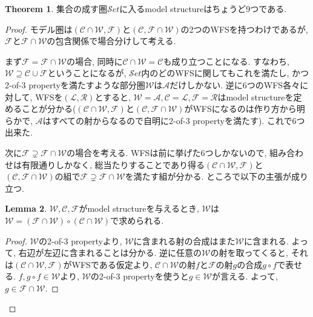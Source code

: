\documentclass[. /main]{subfiles}
\theoremstyle{definition}
\newtheorem{theo}{Theorem}
\newtheorem{lemm}[theo]{Lemma}
\begin{document}
\begin{theo}
集合の成す圏$\mathcal{S}et$に入るmodel structureはちょうど9つである. 
\end{theo}
\begin{proof}
モデル圏は$(\mathcal{C} \cap \mathcal{W},  \mathcal{F})$と$(\mathcal{C},  \mathcal{F} \cap \mathcal{W})$の2つのWFSを持つわけであるが, $\mathcal{F}$と$\mathcal{F} \cap \mathcal{W}$の包含関係で場合分けして考える. 

まず$\mathcal{F}=\mathcal{F} \cap \mathcal{W}$の場合, 同時に$\mathcal{C} \cap \mathcal{W}=\mathcal{C}$も成り立つことになる. すなわち, $\mathcal{W} \supseteq \mathcal{C} \cup \mathcal{F}$ということになるが, $\mathcal{S}et$内のどのWFSに関してもこれを満たし, かつ2-of-3 propertyを満たすような部分圏$\mathcal{W}$は$\mathcal{A}$だけしかない. 逆に6つのWFS各々に対して, WFSを$(\mathcal{L},  \mathcal{R})$とすると, $\mathcal{W}=\mathcal{A},  \mathcal{C}=\mathcal{L},  \mathcal{F}=\mathcal{R}$はmodel structureを定めることが分かる($(\mathcal{C} \cap \mathcal{W},  \mathcal{F})$と$(\mathcal{C},  \mathcal{F} \cap \mathcal{W})$がWFSになるのは作り方から明らかで, $\mathcal{A}$はすべての射からなるので自明に2-of-3 propertyを満たす). これで6つ出来た. 

次に$\mathcal{F} \supsetneq \mathcal{F} \cap \mathcal{W}$の場合を考える. WFSは前に挙げた6つしかないので, 組み合わせは有限通りしかなく, 総当たりすることであり得る$(\mathcal{C} \cap \mathcal{W},  \mathcal{F})$と$(\mathcal{C},  \mathcal{F} \cap \mathcal{W})$の組で$\mathcal{F} \supsetneq \mathcal{F} \cap \mathcal{W}$を満たす組が分かる. ところで以下の主張が成り立つ. 
\begin{lemm}
$\mathcal{W},  \mathcal{C},  \mathcal{F}$がmodel structureを与えるとき, $\mathcal{W}$は$\mathcal{W}=(\mathcal{F} \cap \mathcal{W}) \circ (\mathcal{C} \cap \mathcal{W})$で求められる. 
\end{lemm}
\begin{proof} $\mathcal{W}$の2-of-3 propertyより, $\mathcal{W}$に含まれる射の合成はまた$\mathcal{W}$に含まれる. よって, 右辺が左辺に含まれることは分かる. 逆に任意の$\mathcal{W}$の射を取ってくると, それは$(\mathcal{C} \cap \mathcal{W},  \mathcal{F})$がWFSである仮定より, $\mathcal{C} \cap \mathcal{W}$の射$f$と$\mathcal{F}$の射$g$の合成$g \circ f$で表せる. $f,  g \circ f \in \mathcal{W}$より, $\mathcal{W}$の2-of-3 propertyを使うと$g \in \mathcal{W}$が言える. よって, $g \in \mathcal{F} \cap \mathcal{W}$.
\end{proof}


\end{proof}
\end{document}
